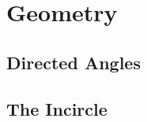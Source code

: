 \section{Geometry}
\subsection{Directed Angles}\label{n:g:directed}
\subsection{The Incircle}\label{n:g:incircle}
